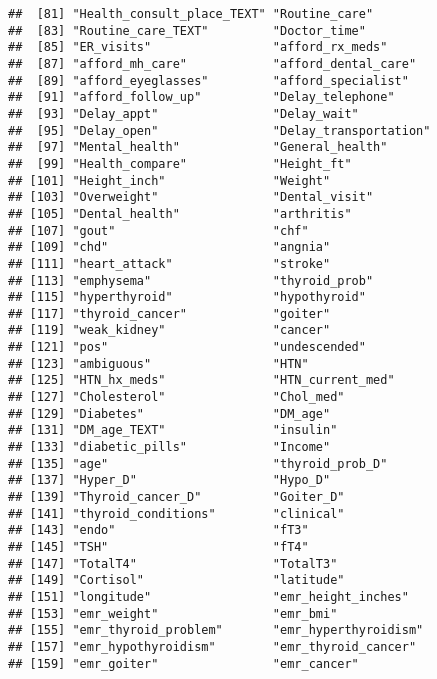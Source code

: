 \documentclass[]{article}
\begin{document}
\begin{verbatim}
##  [81] "Health_consult_place_TEXT" "Routine_care"             
##  [83] "Routine_care_TEXT"         "Doctor_time"              
##  [85] "ER_visits"                 "afford_rx_meds"           
##  [87] "afford_mh_care"            "afford_dental_care"       
##  [89] "afford_eyeglasses"         "afford_specialist"        
##  [91] "afford_follow_up"          "Delay_telephone"          
##  [93] "Delay_appt"                "Delay_wait"               
##  [95] "Delay_open"                "Delay_transportation"     
##  [97] "Mental_health"             "General_health"           
##  [99] "Health_compare"            "Height_ft"                
## [101] "Height_inch"               "Weight"                   
## [103] "Overweight"                "Dental_visit"             
## [105] "Dental_health"             "arthritis"                
## [107] "gout"                      "chf"                      
## [109] "chd"                       "angnia"                   
## [111] "heart_attack"              "stroke"                   
## [113] "emphysema"                 "thyroid_prob"             
## [115] "hyperthyroid"              "hypothyroid"              
## [117] "thyroid_cancer"            "goiter"                   
## [119] "weak_kidney"               "cancer"                   
## [121] "pos"                       "undescended"              
## [123] "ambiguous"                 "HTN"                      
## [125] "HTN_hx_meds"               "HTN_current_med"          
## [127] "Cholesterol"               "Chol_med"                 
## [129] "Diabetes"                  "DM_age"                   
## [131] "DM_age_TEXT"               "insulin"                  
## [133] "diabetic_pills"            "Income"                   
## [135] "age"                       "thyroid_prob_D"           
## [137] "Hyper_D"                   "Hypo_D"                   
## [139] "Thyroid_cancer_D"          "Goiter_D"                 
## [141] "thyroid_conditions"        "clinical"                 
## [143] "endo"                      "fT3"                      
## [145] "TSH"                       "fT4"                      
## [147] "TotalT4"                   "TotalT3"                  
## [149] "Cortisol"                  "latitude"                 
## [151] "longitude"                 "emr_height_inches"        
## [153] "emr_weight"                "emr_bmi"                  
## [155] "emr_thyroid_problem"       "emr_hyperthyroidism"      
## [157] "emr_hypothyroidism"        "emr_thyroid_cancer"       
## [159] "emr_goiter"                "emr_cancer"               

\end{verbatim}
\end{document}
